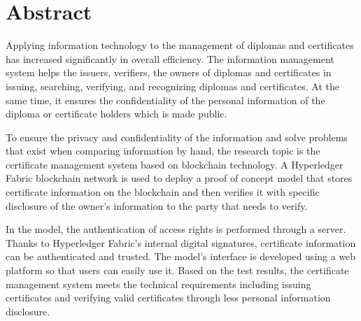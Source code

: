 \chapter*{Abstract}
Applying information technology to the management of diplomas and certificates has increased significantly in overall efficiency. The information management system helps the issuers, verifiers, the owners of diplomas and certificates in issuing, searching, verifying, and recognizing diplomas and certificates. At the same time, it ensures the confidentiality of the personal information of the diploma or certificate holders which is made public.

To ensure the privacy and confidentiality of the information and solve problems that exist when comparing information by hand, the research topic is the certificate management system based on blockchain technology. A Hyperledger Fabric blockchain network is used to deploy a proof of concept model that stores certificate information on the blockchain and then verifies it with specific disclosure of the owner’s information to the party that needs to verify.

In the model, the authentication of access rights is performed through a server. Thanks to Hyperledger Fabric's internal digital signatures, certificate information can be authenticated and trusted. The model’s interface is developed using a web platform so that users can easily use it. Based on the test results, the certificate management system meets the technical requirements including issuing certificates and verifying valid certificates through less personal information disclosure.
